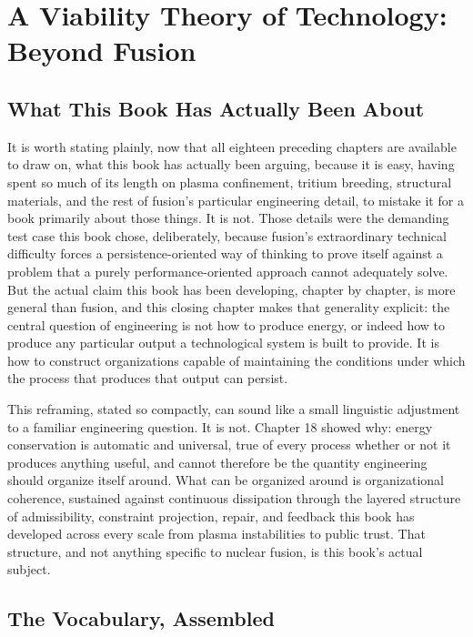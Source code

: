 \chapter{A Viability Theory of Technology: Beyond Fusion}

\section{What This Book Has Actually Been About}

It is worth stating plainly, now that all eighteen preceding chapters are available to draw on, what this book has actually been arguing, because it is easy, having spent so much of its length on plasma confinement, tritium breeding, structural materials, and the rest of fusion's particular engineering detail, to mistake it for a book primarily about those things. It is not. Those details were the demanding test case this book chose, deliberately, because fusion's extraordinary technical difficulty forces a persistence-oriented way of thinking to prove itself against a problem that a purely performance-oriented approach cannot adequately solve. But the actual claim this book has been developing, chapter by chapter, is more general than fusion, and this closing chapter makes that generality explicit: the central question of engineering is not how to produce energy, or indeed how to produce any particular output a technological system is built to provide. It is how to construct organizations capable of maintaining the conditions under which the process that produces that output can persist.

This reframing, stated so compactly, can sound like a small linguistic adjustment to a familiar engineering question. It is not. Chapter 18 showed why: energy conservation is automatic and universal, true of every process whether or not it produces anything useful, and cannot therefore be the quantity engineering should organize itself around. What can be organized around is organizational coherence, sustained against continuous dissipation through the layered structure of admissibility, constraint projection, repair, and feedback this book has developed across every scale from plasma instabilities to public trust. That structure, and not anything specific to nuclear fusion, is this book's actual subject.

\section{The Vocabulary, Assembled}

